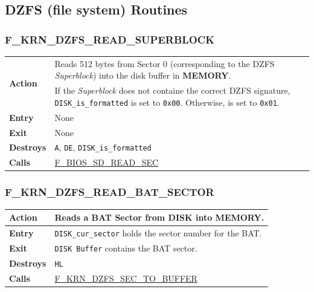 \documentclass[a4paper,11pt]{article}
\begin{document}
    \subsection{DZFS (file system) Routines}

        \subsubsection{F\_KRN\_DZFS\_READ\_SUPERBLOCK}
        \label{func:fkrndzfsreadsuperblock}
        \begin{tabular}{l p{9cm}}
            \hline\multirow[t]{2}{4em}{\textbf{Action}}
            & Reads 512 bytes from Sector 0 (corresponding to the DZFS 
            \textit{Superblock}) into the disk buffer in \textbf{MEMORY}.\\
            & If the \textit{Superblock} does not containe the correct DZFS
            signature, \texttt{DISK\_is\_formatted} is set to \texttt{0x00}. Otherwise, is
            set to \texttt{0x01}.\\
            \hline\textbf{Entry} & None \\
            \hline\textbf{Exit} & None \\
            \hline\textbf{Destroys} & \texttt{A}, \texttt{DE},
            \texttt{DISK\_is\_formatted} \\
            \hline\textbf{Calls}
            & \hyperref[func:fbiosdiskreadsec]{F\_BIOS\_SD\_READ\_SEC}\\
            \hline
        \end{tabular}

        \subsubsection{F\_KRN\_DZFS\_READ\_BAT\_SECTOR}
        \label{func:fkrndzfsreadbatsector}
        \begin{tabular}{l p{9cm}}
            \hline\textbf{Action}
            & Reads a BAT Sector from \textbf{DISK} into \textbf{MEMORY}.\\
            \hline\textbf{Entry} & \texttt{DISK\_cur\_sector} holds the sector 
            number for the BAT.\\
            \hline\textbf{Exit} & \texttt{DISK Buffer} contains the BAT sector.\\
            \hline\textbf{Destroys} & \texttt{HL} \\
            \hline\textbf{Calls}
            & \hyperref[func:fkrndzfssectobuffer]{F\_KRN\_DZFS\_SEC\_TO\_BUFFER}\\
            \hline
        \end{tabular}
\end{document}
